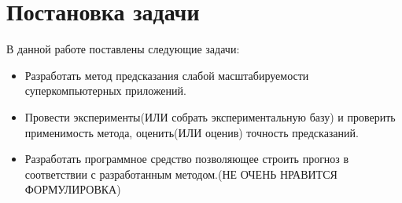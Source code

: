 \chapter{Постановка задачи}
	В данной работе поставлены следующие задачи:
	\begin{itemize}
		\item Разработать метод предсказания слабой масштабируемости суперкомпьютерных приложений.
		\item Провести эксперименты(ИЛИ собрать экспериментальную базу) и проверить применимость метода, оценить(ИЛИ оценив) точность предсказаний.
		\item Разработать программное средство позволяющее строить прогноз в соответствии с разработанным методом.(НЕ ОЧЕНЬ НРАВИТСЯ ФОРМУЛИРОВКА)
	\end{itemize}


\clearpage